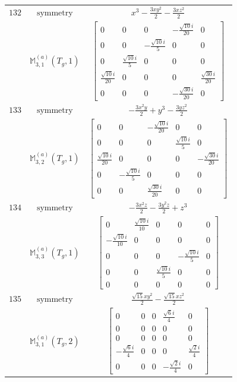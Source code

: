\documentclass[fleqn,8pt,landscape]{jsarticle}
\begin{document}
\begin{longtable}{ccc}
$ 132 $ & $ \text{symmetry} $ & $ x^{3} - \frac{3 x y^{2}}{2} - \frac{3 x z^{2}}{2} $ \\
$  $ & $ \mathbb{M}_{3,1}^{(a)}(T_{g},1) $ & $ \begin{bmatrix} 0 & 0 & 0 & - \frac{\sqrt{10} i}{20} & 0 \\ 0 & 0 & - \frac{\sqrt{10} i}{5} & 0 & 0 \\ 0 & \frac{\sqrt{10} i}{5} & 0 & 0 & 0 \\ \frac{\sqrt{10} i}{20} & 0 & 0 & 0 & \frac{\sqrt{30} i}{20} \\ 0 & 0 & 0 & - \frac{\sqrt{30} i}{20} & 0 \end{bmatrix} $ \\ \hline
$ 133 $ & $ \text{symmetry} $ & $ - \frac{3 x^{2} y}{2} + y^{3} - \frac{3 y z^{2}}{2} $ \\
$  $ & $ \mathbb{M}_{3,2}^{(a)}(T_{g},1) $ & $ \begin{bmatrix} 0 & 0 & - \frac{\sqrt{10} i}{20} & 0 & 0 \\ 0 & 0 & 0 & \frac{\sqrt{10} i}{5} & 0 \\ \frac{\sqrt{10} i}{20} & 0 & 0 & 0 & - \frac{\sqrt{30} i}{20} \\ 0 & - \frac{\sqrt{10} i}{5} & 0 & 0 & 0 \\ 0 & 0 & \frac{\sqrt{30} i}{20} & 0 & 0 \end{bmatrix} $ \\ \hline
$ 134 $ & $ \text{symmetry} $ & $ - \frac{3 x^{2} z}{2} - \frac{3 y^{2} z}{2} + z^{3} $ \\
$  $ & $ \mathbb{M}_{3,3}^{(a)}(T_{g},1) $ & $ \begin{bmatrix} 0 & \frac{\sqrt{10} i}{10} & 0 & 0 & 0 \\ - \frac{\sqrt{10} i}{10} & 0 & 0 & 0 & 0 \\ 0 & 0 & 0 & - \frac{\sqrt{10} i}{5} & 0 \\ 0 & 0 & \frac{\sqrt{10} i}{5} & 0 & 0 \\ 0 & 0 & 0 & 0 & 0 \end{bmatrix} $ \\ \hline
$ 135 $ & $ \text{symmetry} $ & $ \frac{\sqrt{15} x y^{2}}{2} - \frac{\sqrt{15} x z^{2}}{2} $ \\
$  $ & $ \mathbb{M}_{3,1}^{(a)}(T_{g},2) $ & $ \begin{bmatrix} 0 & 0 & 0 & \frac{\sqrt{6} i}{4} & 0 \\ 0 & 0 & 0 & 0 & 0 \\ 0 & 0 & 0 & 0 & 0 \\ - \frac{\sqrt{6} i}{4} & 0 & 0 & 0 & \frac{\sqrt{2} i}{4} \\ 0 & 0 & 0 & - \frac{\sqrt{2} i}{4} & 0 \end{bmatrix} $ \\ \hline

\end{longtable}
\end{document}
